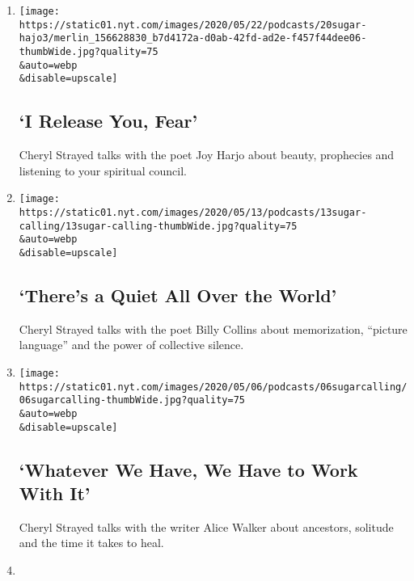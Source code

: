 \begin{enumerate}
\def\labelenumi{\arabic{enumi}.}
\item
  \href{/2020/05/20/podcasts/sugar-calling-joy-harjo-poetry-virus.html}{}

  \texttt{[image: https://static01.nyt.com/images/2020/05/22/podcasts/20sugar-hajo3/merlin\_156628830\_b7d4172a-d0ab-42fd-ad2e-f457f44dee06-thumbWide.jpg?quality=75\\\&auto=webp\\\&disable=upscale]}

  \hypertarget{i-release-you-fear}{%
  \subsection{`I Release You, Fear'}\label{i-release-you-fear}}

  Cheryl Strayed talks with the poet Joy Harjo about beauty, prophecies
  and listening to your spiritual council.
\item
  \href{/2020/05/13/podcasts/sugar-calling-billy-collins-poetry-virus.html}{}

  \texttt{[image: https://static01.nyt.com/images/2020/05/13/podcasts/13sugar-calling/13sugar-calling-thumbWide.jpg?quality=75\\\&auto=webp\\\&disable=upscale]}

  \hypertarget{theres-a-quiet-all-over-the-world}{%
  \subsection{`There's a Quiet All Over the
  World'}\label{theres-a-quiet-all-over-the-world}}

  Cheryl Strayed talks with the poet Billy Collins about memorization,
  ``picture language'' and the power of collective silence.
\item
  \href{/2020/05/06/podcasts/sugar-calling-alice-walker-quarantine-virus.html}{}

  \texttt{[image: https://static01.nyt.com/images/2020/05/06/podcasts/06sugarcalling/06sugarcalling-thumbWide.jpg?quality=75\\\&auto=webp\\\&disable=upscale]}

  \hypertarget{whatever-we-have-we-have-to-work-with-it}{%
  \subsection{`Whatever We Have, We Have to Work With
  It'}\label{whatever-we-have-we-have-to-work-with-it}}

  Cheryl Strayed talks with the writer Alice Walker about ancestors,
  solitude and the time it takes to heal.
\item
  \href{/2020/04/29/podcasts/sugar-calling-judy-blume-quarantine-virus.html}{}


\end{enumerate}
